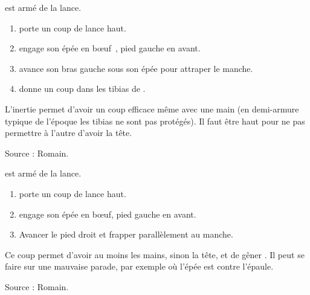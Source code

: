 \begin{technique}

\A est armé de la lance.

\begin{enumerate}
	\item \A porte un coup de lance haut.
	
	\item \D engage son épée en bœuf~\footnotemark, pied gauche en avant.
	
	\item \D avance son bras gauche sous son épée pour attraper le manche.
	
	\item \D donne un coup dans les tibias de \A.
\end{enumerate}

L'inertie permet d'avoir un coup efficace même avec une main (en demi-armure typique de l'époque les tibias ne sont pas protégés).
Il faut être haut pour ne pas permettre à l'autre d'avoir la tête.

Source : Romain.
\end{technique}


\begin{technique}

\A est armé de la lance.

\begin{enumerate}
	\item \A porte un coup de lance haut.
	
	\item \D engage son épée en bœuf, pied gauche en avant.
	
	\item Avancer le pied droit et frapper parallèlement au manche. 
\end{enumerate}

Ce coup permet d'avoir au moins les mains, sinon la tête, et de gêner \A.
Il peut se faire sur une mauvaise parade, par exemple où l'épée est contre l'épaule.

Source : Romain.
\end{technique}


